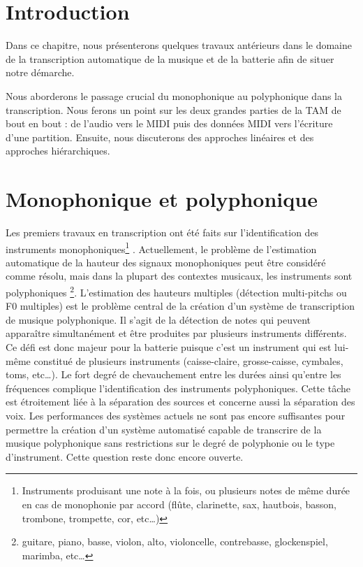 \section*{Introduction}
Dans ce chapitre, nous présenterons quelques travaux antérieurs dans le domaine
de la transcription automatique de la musique et de la batterie afin de situer
notre démarche.

Nous aborderons le passage crucial du monophonique au polyphonique dans la
transcription. Nous ferons un point sur les deux grandes parties de la TAM de
bout en bout : de l’audio vers le MIDI puis des données MIDI vers l’écriture
d’une partition. Ensuite, nous discuterons des approches linéaires et des
approches hiérarchiques.

\section{Monophonique et polyphonique}
Les premiers travaux en transcription ont été faits sur l’identification des
instruments monophoniques\footnote{Instruments produisant une note à la fois,
ou plusieurs notes de même durée en cas de monophonie par accord (flûte,
clarinette, sax, hautbois, basson, trombone, trompette, cor, etc…)}
\cite{future_directions}. Actuellement, le problème de l'estimation automatique
de la hauteur des signaux monophoniques peut être considéré comme résolu, mais
dans la plupart des contextes musicaux, les instruments sont polyphoniques
\footnote{guitare, piano, basse, violon, alto, violoncelle, contrebasse,
glockenspiel, marimba, etc…}. L'estimation des hauteurs multiples (détection
multi-pitchs ou F0 multiples) est le problème central de la création d'un
système de transcription de musique polyphonique. Il s’agit de la détection de
notes qui peuvent apparaître simultanément et être produites par plusieurs
instruments différents. Ce défi est donc majeur pour la batterie puisque c’est
un instrument qui est lui-même constitué de plusieurs instruments
(caisse-claire, grosse-caisse, cymbales, toms, etc…). Le fort degré de
chevauchement entre les durées ainsi qu’entre les fréquences complique
l’identification des instruments polyphoniques. Cette tâche est étroitement
liée à la séparation des sources et concerne aussi la séparation des voix. Les
performances des systèmes actuels ne sont pas encore suffisantes pour permettre
la création d'un système automatisé capable de transcrire de la musique
polyphonique sans restrictions sur le degré de polyphonie ou le type
d'instrument. Cette question reste donc encore ouverte. 

